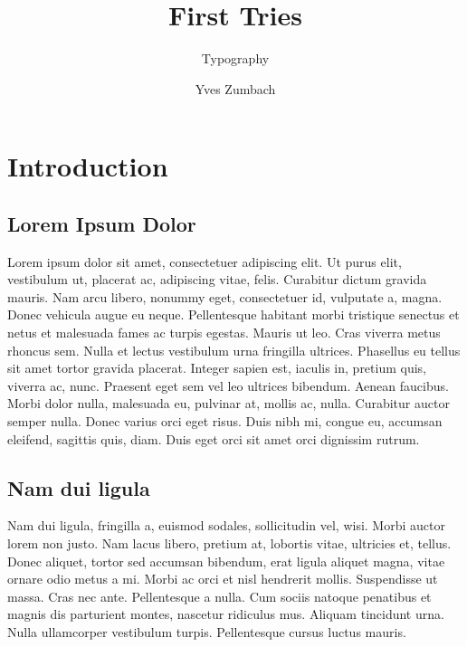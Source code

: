 \documentclass[portable]{yReport}
\author{Yves Zumbach}
\subtitle{Typography}
\title{First Tries}
\begin{document}
	
	
	\chapter{Introduction}
	\section{Lorem Ipsum Dolor}
	Lorem ipsum dolor sit amet, consectetuer adipiscing elit. Ut purus elit,
	vestibulum ut, placerat ac, adipiscing vitae, felis. Curabitur dictum gravida
	mauris. Nam arcu libero, nonummy eget, consectetuer id, vulputate a, magna.
	Donec vehicula augue eu neque. Pellentesque habitant morbi tristique
	senectus et netus et malesuada fames ac turpis egestas\sideNote[white]{\lipsum[3]}. Mauris ut leo.
	Cras viverra metus rhoncus sem. Nulla et lectus vestibulum urna fringilla
	ultrices. Phasellus eu tellus sit amet tortor gravida placerat. Integer sapien
	est, iaculis in, pretium quis, viverra ac, nunc. Praesent eget sem vel leo ultrices bibendum. Aenean faucibus. Morbi dolor nulla, malesuada eu, pulvinar
	at, mollis ac, nulla. Curabitur auctor semper nulla. Donec varius orci eget
	risus. Duis nibh mi, congue eu, accumsan eleifend, sagittis quis, diam. Duis
	eget orci sit amet orci dignissim rutrum.
	
	\section{Nam dui ligula}
	
	Nam dui ligula, fringilla a, euismod sodales, sollicitudin vel, wisi. Morbi auctor lorem non justo. Nam lacus libero, pretium at, lobortis vitae, ultricies et, tellus. Donec aliquet, tortor sed accumsan bibendum, erat ligula aliquet magna, vitae ornare odio metus a mi. Morbi ac orci et nisl hendrerit mollis. Suspendisse ut massa. Cras nec ante. Pellentesque a nulla. Cum sociis natoque penatibus et magnis dis parturient montes, nascetur ridiculus mus. Aliquam tincidunt urna. Nulla ullamcorper vestibulum turpis. Pellentesque cursus luctus mauris.
	
\end{document}
